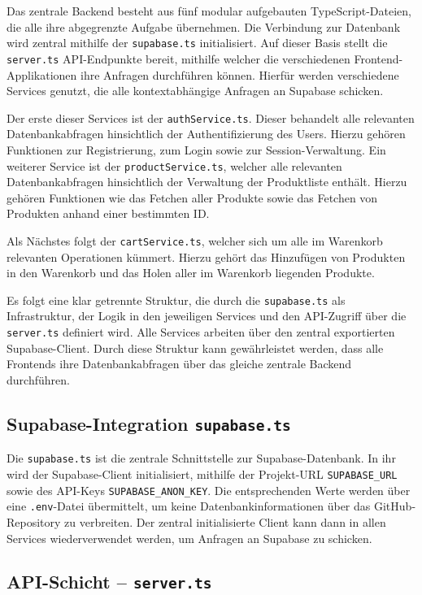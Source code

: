 \documentclass[oneside]{ausarbeitung}
\begin{document}
Das zentrale Backend besteht aus fünf modular aufgebauten TypeScript-Dateien, die alle ihre abgegrenzte Aufgabe übernehmen. Die Verbindung zur Datenbank wird zentral mithilfe der \texttt{supabase.ts} initialisiert. Auf dieser Basis stellt die \texttt{server.ts} API-Endpunkte bereit, mithilfe welcher die verschiedenen Frontend-Applikationen ihre Anfragen durchführen können. Hierfür werden verschiedene Services genutzt, die alle kontextabhängige Anfragen an Supabase schicken.

Der erste dieser Services ist der \texttt{authService.ts}. Dieser behandelt alle relevanten Datenbankabfragen hinsichtlich der Authentifizierung des Users. Hierzu gehören Funktionen zur Registrierung, zum Login sowie zur Session-Verwaltung. Ein weiterer Service ist der \texttt{productService.ts}, welcher alle relevanten Datenbankabfragen hinsichtlich der Verwaltung der Produktliste enthält. Hierzu gehören Funktionen wie das Fetchen aller Produkte sowie das Fetchen von Produkten anhand einer bestimmten ID.

Als Nächstes folgt der \texttt{cartService.ts}, welcher sich um alle im Warenkorb relevanten Operationen kümmert. Hierzu gehört das Hinzufügen von Produkten in den Warenkorb und das Holen aller im Warenkorb liegenden Produkte.

Es folgt eine klar getrennte Struktur, die durch die \texttt{supabase.ts} als Infrastruktur, der Logik in den jeweiligen Services und den API-Zugriff über die \texttt{server.ts} definiert wird. Alle Services arbeiten über den zentral exportierten Supabase-Client. Durch diese Struktur kann gewährleistet werden, dass alle Frontends ihre Datenbankabfragen über das gleiche zentrale Backend durchführen.

\subsection{Supabase-Integration \texttt{supabase.ts}}

Die \texttt{supabase.ts} ist die zentrale Schnittstelle zur Supabase-Datenbank. In ihr wird der Supabase-Client initialisiert, mithilfe der Projekt-URL \texttt{SUPABASE\_URL} sowie des API-Keys \texttt{SUPABASE\_ANON\_KEY}. Die entsprechenden Werte werden über eine \texttt{.env}-Datei übermittelt, um keine Datenbankinformationen über das GitHub-Repository zu verbreiten. Der zentral initialisierte Client kann dann in allen Services wiederverwendet werden, um Anfragen an Supabase zu schicken.

\subsection{API-Schicht – \texttt{server.ts}}
\end{document}
